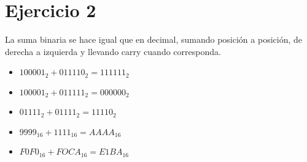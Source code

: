 \section*{Ejercicio 2}

La suma binaria se hace igual que en decimal, sumando posición a posición, de derecha a izquierda y llevando carry cuando corresponda.

\begin{itemize}
    \item $ 100001_2 + 011110_2 = 111111_2 $
    \item $ 100001_2 + 011111_2 = 000000_2 $
    \item $ 01111_2 + 01111_2 = 11110_2 $
    \item $ 9999_{16} + 1111_{16} = AAAA_{16} $
    \item $ F0F0_{16} + FOCA_{16} = E1BA_{16} $
\end{itemize}